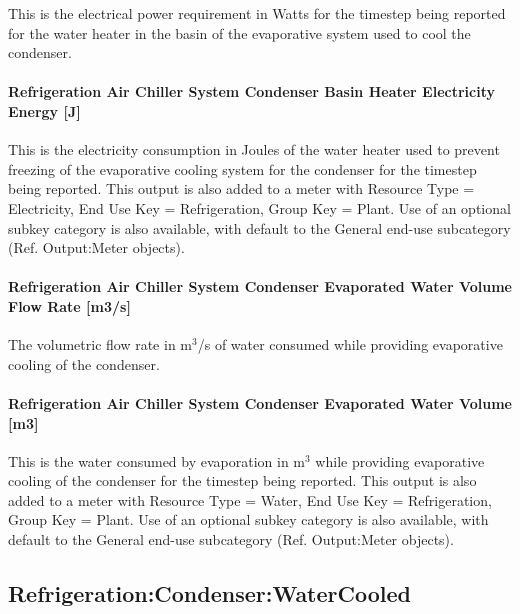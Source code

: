 This is the electrical power requirement in Watts for the timestep being reported for the water heater in the basin of the evaporative system used to cool the condenser.

\paragraph{Refrigeration Air Chiller System Condenser Basin Heater Electricity Energy {[}J{]}}\label{refrigeration-air-chiller-system-condenser-basin-heater-electric-energy-j}

This is the electricity consumption in Joules of the water heater used to prevent freezing of the evaporative cooling system for the condenser for the timestep being reported. This output is also added to a meter with Resource Type = Electricity, End Use Key = Refrigeration, Group Key = Plant. Use of an optional subkey category is also available, with default to the General end-use subcategory (Ref. Output:Meter objects).

\paragraph{Refrigeration Air Chiller System Condenser Evaporated Water Volume Flow Rate {[}m3/s{]}}\label{refrigeration-air-chiller-system-condenser-evaporated-water-volume-flow-rate-m3s}

The volumetric flow rate in m\(^{3}\)/s of water consumed while providing evaporative cooling of the condenser.

\paragraph{Refrigeration Air Chiller System Condenser Evaporated Water Volume {[}m3{]}}\label{refrigeration-air-chiller-system-condenser-evaporated-water-volume-m3}

This is the water consumed by evaporation in m\(^{3}\) while providing evaporative cooling of the condenser for the timestep being reported. This output is also added to a meter with Resource Type = Water, End Use Key = Refrigeration, Group Key = Plant. Use of an optional subkey category is also available, with default to the General end-use subcategory (Ref. Output:Meter objects).

\subsection{Refrigeration:Condenser:WaterCooled}\label{refrigerationcondenserwatercooled}

